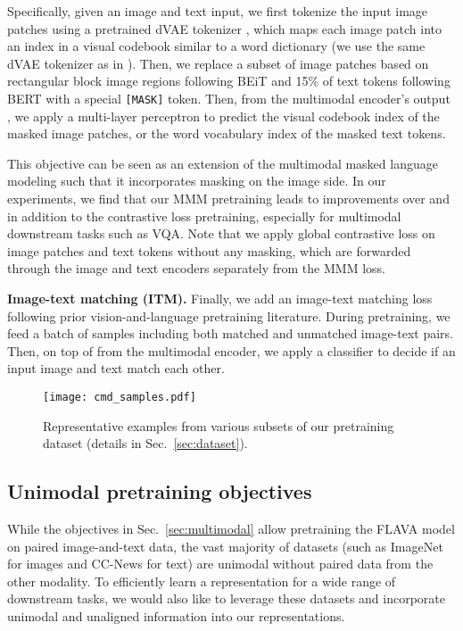 \documentclass[10pt,twocolumn,letterpaper]{article}
\newcommand{\myparagraph}[1]{\vspace{0.25em}\noindent\textbf{#1}}
\begin{document}
Specifically, given an image and text input, we first tokenize the input image patches using a pretrained dVAE tokenizer \cite{dalle}, which maps each image patch into an index in a visual codebook similar to a word dictionary (we use the same dVAE tokenizer as in \cite{bao2021beit}). Then, we replace a subset of image patches based on rectangular block image regions following BEiT \cite{bao2021beit} and 15\% of text tokens following BERT \cite{devlin2018bert} with a special \texttt{[MASK]} token. Then, from the multimodal encoder's output , we apply a multi-layer perceptron to predict the visual codebook index of the masked image patches, or the word vocabulary index of the masked text tokens.

This objective can be seen as an extension of the multimodal masked language modeling such that it incorporates masking on the image side. In our experiments, we find that our MMM pretraining leads to improvements over and in addition to the contrastive loss pretraining, especially for multimodal downstream tasks such as VQA. Note that we apply global contrastive loss on image patches and text tokens without any masking, which are forwarded through the image and text encoders separately from the MMM loss.

\myparagraph{Image-text matching (ITM).} Finally, we add an image-text matching loss  following prior vision-and-language pretraining literature\cite{lu2019vilbert,tan2019LXMERTLC,chen2020uniter}. During pretraining, we feed a batch of samples including both matched and unmatched image-text pairs. Then, on top of  from the multimodal encoder, we apply a classifier to decide if an input image and text match each other.

\begin{figure*}[t]
\vspace{-1.5em}
\centering
\texttt{[image: cmd\_samples.pdf]}
\vspace{-0.9em}
\caption{Representative examples from various subsets of our pretraining dataset (details in Sec.~\ref{sec:dataset}).}
\label{fig:cmd}
\vspace{-1em}
\end{figure*}

\subsection{Unimodal pretraining objectives}
\label{sec:unimodal}

While the objectives in Sec.~\ref{sec:multimodal} allow pretraining the FLAVA model on paired image-and-text data, the vast majority of datasets (such as ImageNet for images and CC-News for text) are unimodal without paired data from the other modality. To efficiently learn a representation for a wide range of downstream tasks, we would also like to leverage these datasets and incorporate unimodal and unaligned information into our representations.
\end{document}
